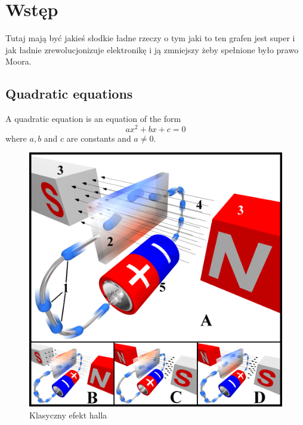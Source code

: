 \chapter{Wstęp}

Tutaj mają być jakieś słodkie ładne rzeczy o tym jaki to ten grafen jest super i
jak ładnie zrewolucjonizuje elektronikę i ją zmniejszy żeby spełnione było prawo
Moora.



	\section*{Quadratic equations}
			A quadratic equation is an equation of the form
			\begin{equation}
			\label{quad}
				ax^2 + bx + c = 0
			\end{equation}
			where \( a, b \) and \( c \) are constants and \( a \neq 0 \).
		\begin{figure}
		\includegraphics[width = 0.4\textheight]{./Rozdzial_1/Hall_effect.png}
		\caption{Klasyczny efekt halla}
		\label{klasyczny_hall}
		\end{figure}
\lipsum
